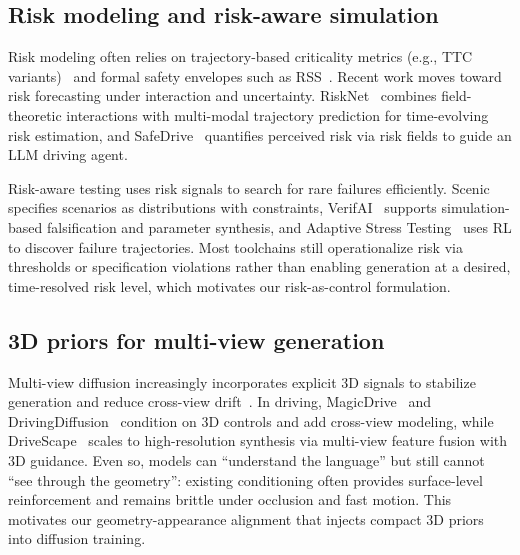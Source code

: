 \documentclass{article}
\begin{document}
\subsection{Risk modeling and risk-aware simulation}

Risk modeling often relies on trajectory-based criticality metrics (e.g., TTC variants)~\cite{xu2023deep,westhofen2023criticality} and formal safety envelopes such as RSS~\cite{shalev2017formal}. Recent work moves toward risk forecasting under interaction and uncertainty. RiskNet~\cite{liu2026risknet} combines field-theoretic interactions with multi-modal trajectory prediction for time-evolving risk estimation, and SafeDrive~\cite{zhou2026safedrive} quantifies perceived risk via risk fields to guide an LLM driving agent.

Risk-aware testing uses risk signals to search for rare failures efficiently. Scenic~\cite{fremont2019scenic} specifies scenarios as distributions with constraints, VerifAI~\cite{dreossi2019verifai} supports simulation-based falsification and parameter synthesis, and Adaptive Stress Testing~\cite{koren2018adaptive} uses RL to discover failure trajectories. Most toolchains still operationalize risk via thresholds or specification violations rather than enabling generation at a desired, time-resolved risk level, which motivates our risk-as-control formulation.

\subsection{3D priors for multi-view generation}

Multi-view diffusion increasingly incorporates explicit 3D signals to stabilize generation and reduce cross-view drift~\cite{tang2025priorfusion}. In driving, MagicDrive~\cite{gao2023magicdrive} and DrivingDiffusion~\cite{li2024drivingdiffusion} condition on 3D controls and add cross-view modeling, while DriveScape~\cite{wu2025drivescape} scales to high-resolution synthesis via multi-view feature fusion with 3D guidance. Even so, models can ``understand the language'' but still cannot ``see through the geometry'': existing conditioning often provides surface-level reinforcement and remains brittle under occlusion and fast motion. This motivates our geometry-appearance alignment that injects compact 3D priors into diffusion training.
\end{document}
